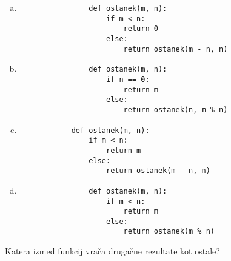 \documentclass[arhiv, 10pt]{../izpit}
\begin{document}
        \begin{multicols}{2}
        \begin{enumerate}[(a)]
\item 
                \begin{verbatim}
                def ostanek(m, n):
                    if m < n:
                        return 0
                    else:
                        return ostanek(m - n, n)
                \end{verbatim}
            
\item 
                \begin{verbatim}
                def ostanek(m, n):
                    if n == 0:
                        return m
                    else:
                        return ostanek(n, m % n)
                \end{verbatim}
            
\item 
            \begin{verbatim}
            def ostanek(m, n):
                if m < n:
                    return m
                else:
                    return ostanek(m - n, n)
            \end{verbatim}
        
\item 
                \begin{verbatim}
                def ostanek(m, n):
                    if m < n:
                        return m
                    else:
                        return ostanek(m % n)
                \end{verbatim}
            
\end{enumerate}

        \end{multicols}
    
        \naloga*
        
        Katera izmed funkcij vrača drugačne rezultate kot ostale?
    
\end{document}
